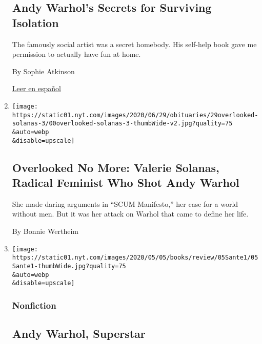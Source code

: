 \begin{enumerate}
{  \subsection{Andy Warhol's Secrets for Surviving
  Isolation}\label{andy-warhols-secrets-for-surviving-isolation}}

  The famously social artist was a secret homebody. His self-help book
  gave me permission to actually have fun at home.

  By Sophie Atkinson

  \href{https://www.nytimes.com/es/2020/07/02/magazine/filosofia-de-andy-warhol.html}{Leer
  en español}
\item
  \href{/2020/06/26/obituaries/valerie-solanas-overlooked.html}{}

  \texttt{[image: https://static01.nyt.com/images/2020/06/29/obituaries/29overlooked-solanas-3/00overlooked-solanas-3-thumbWide-v2.jpg?quality=75\\\&auto=webp\\\&disable=upscale]}

  \hypertarget{overlooked-no-more-valerie-solanas-radical-feminist-who-shot-andy-warhol}{%
  \subsection{Overlooked No More: Valerie Solanas, Radical Feminist Who
  Shot Andy
  Warhol}\label{overlooked-no-more-valerie-solanas-radical-feminist-who-shot-andy-warhol}}

  She made daring arguments in ``SCUM Manifesto,'' her case for a world
  without men. But it was her attack on Warhol that came to define her
  life.

  By Bonnie Wertheim
\item
  \href{/2020/05/03/books/review/warhol-blake-gopnik.html}{}

  \texttt{[image: https://static01.nyt.com/images/2020/05/05/books/review/05Sante1/05Sante1-thumbWide.jpg?quality=75\\\&auto=webp\\\&disable=upscale]}

  \hypertarget{nonfiction}{%
  \subsubsection{Nonfiction}\label{nonfiction}}

  \hypertarget{andy-warhol-superstar}{%
  \subsection{Andy Warhol, Superstar}\label{andy-warhol-superstar}}


\end{enumerate}
